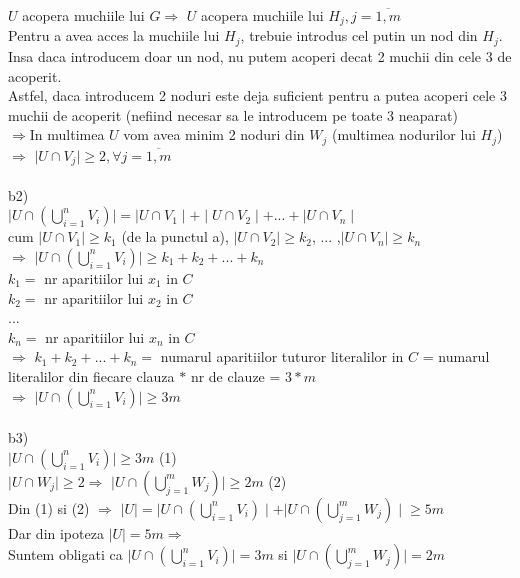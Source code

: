 \documentclass{article}
\begin{document}
$U$ acopera muchiile lui $G$$\Rightarrow$ $U$ acopera muchiile lui $H_j, j =\overline{1,m}$\\
Pentru a avea acces la muchiile lui $H_j$, trebuie introdus cel putin un nod din $H_j$. Insa daca introducem doar un nod, nu putem acoperi decat 2 muchii din cele 3 de acoperit.\\
Astfel, daca introducem 2 noduri este deja suficient pentru a putea acoperi cele 3 muchii de acoperit (nefiind necesar sa le introducem pe toate 3 neaparat)\\
$\Rightarrow$In multimea $U$ vom avea minim 2 noduri din $W_j$ (multimea nodurilor lui $H_j$)\\
$\Rightarrow$ $\mid U \cap V_j \mid \geq2, \forall j=\overline{1,m}$\\
\bigskip\\
b2)\\
$\mid U \cap(\bigcup\limits_{i=1}^n V_i) \mid = \mid U \cap V_1\mid + \mid U \cap V_2 \mid + ... + \mid U \cap V_n \mid$\\
cum $\mid U \cap V_1 \mid \geq k_1 $ (de la punctul a), $\mid U \cap V_2 \mid \geq k_2$, ... ,$\mid U \cap V_n \mid \geq k_n$ \\
$\Rightarrow$ $\mid U \cap(\bigcup\limits_{i=1}^n V_i) \mid \geq k_1 + k_2 + ... + k_n $\\
$k_1=$ nr aparitiilor lui $x_1$ in $C$\\
$k_2=$ nr aparitiilor lui $x_2$ in $C$\\
$...$\\
$k_n=$ nr aparitiilor lui $x_n$ in $C$\\
$\Rightarrow$ $k_1 + k_2 + ... + k_n = $ numarul aparitiilor tuturor literalilor in $C$ = numarul literalilor din fiecare clauza $*$ nr de clauze = $3*m$ \\
$\Rightarrow$ $\mid U \cap(\bigcup\limits_{i=1}^n V_i) \mid \geq 3m$\\
\bigskip\\
b3)\\
$\mid U \cap(\bigcup\limits_{i=1}^n V_i) \mid \geq 3m$ (1)\\
$\mid U \cap W_j\mid \geq 2 \Rightarrow$
$\mid U \cap(\bigcup\limits_{j=1}^m W_j) \mid \geq 2m$ (2)\\
Din (1) si (2) $\Rightarrow$  $\mid U\mid=\mid U \cap(\bigcup\limits_{i=1}^n V_i)\mid + $$\mid U \cap(\bigcup\limits_{j=1}^m W_j) \mid$$\geq5m$\\
Dar din ipoteza $\mid U\mid=5m\Rightarrow$\\
Suntem obligati ca $\mid U \cap(\bigcup\limits_{i=1}^n V_i) \mid=3m$ si $\mid U \cap(\bigcup\limits_{j=1}^m W_j) \mid=2m $\\
$$
\end{document}
